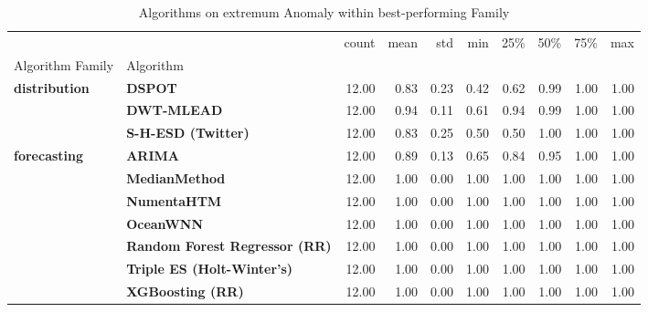 \begin{table}
\caption{Algorithms on extremum Anomaly within best-performing Family}
\label{tab:bp-extremum}
\begin{tabular}{llrrrrrrrr}
\toprule
 &  & count & mean & std & min & 25\% & 50\% & 75\% & max \\
Algorithm Family & Algorithm &  &  &  &  &  &  &  &  \\
\midrule
\multirow[t]{3}{*}{\textbf{distribution}} & \textbf{DSPOT} & 12.00 & 0.83 & 0.23 & 0.42 & 0.62 & 0.99 & 1.00 & 1.00 \\
\textbf{} & \textbf{DWT-MLEAD} & 12.00 & 0.94 & 0.11 & 0.61 & 0.94 & 0.99 & 1.00 & 1.00 \\
\textbf{} & \textbf{S-H-ESD (Twitter)} & 12.00 & 0.83 & 0.25 & 0.50 & 0.50 & 1.00 & 1.00 & 1.00 \\
\cline{1-10}
\multirow[t]{7}{*}{\textbf{forecasting}} & \textbf{ARIMA} & 12.00 & 0.89 & 0.13 & 0.65 & 0.84 & 0.95 & 1.00 & 1.00 \\
\textbf{} & \textbf{MedianMethod} & 12.00 & 1.00 & 0.00 & 1.00 & 1.00 & 1.00 & 1.00 & 1.00 \\
\textbf{} & \textbf{NumentaHTM} & 12.00 & 1.00 & 0.00 & 1.00 & 1.00 & 1.00 & 1.00 & 1.00 \\
\textbf{} & \textbf{OceanWNN} & 12.00 & 1.00 & 0.00 & 1.00 & 1.00 & 1.00 & 1.00 & 1.00 \\
\textbf{} & \textbf{Random Forest Regressor (RR)} & 12.00 & 1.00 & 0.00 & 1.00 & 1.00 & 1.00 & 1.00 & 1.00 \\
\textbf{} & \textbf{Triple ES (Holt-Winter's)} & 12.00 & 1.00 & 0.00 & 1.00 & 1.00 & 1.00 & 1.00 & 1.00 \\
\textbf{} & \textbf{XGBoosting (RR)} & 12.00 & 1.00 & 0.00 & 1.00 & 1.00 & 1.00 & 1.00 & 1.00 \\
\cline{1-10}
\bottomrule
\end{tabular}
\end{table}
